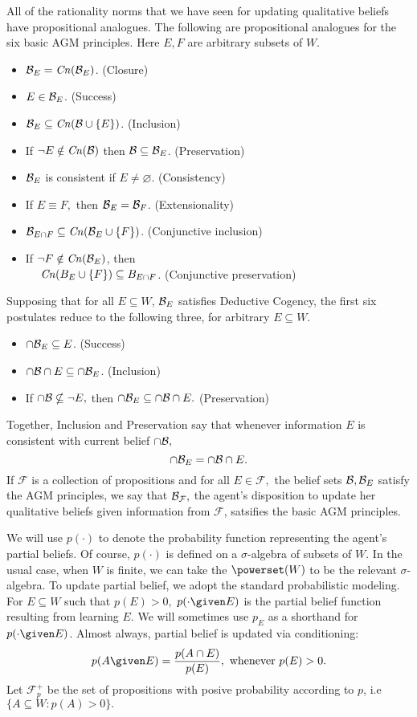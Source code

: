 All of the rationality norms that we have seen for updating qualitative beliefs
have propositional analogues.  The following are propositional analogues for the
six basic AGM principles. Here $E,F$ are arbitrary subsets of $W$.
\begin{itemize}
\item[] $\mathcal{B}_E=\text{\textit{Cn}}(\mathcal{B}_E)$. \hfill(Closure)
\item[] $E\in \mathcal{B}_E$. \hfill(Success)
\item[] $\mathcal{B}_E \subseteq \text{\textit{Cn}}(\mathcal{B} \cup \{ E\})$. \hfill(Inclusion)
\item[] If $\neg E \notin \text{\textit{Cn}}(\mathcal{B})$ then $\mathcal{B} \subseteq \mathcal{B}_E$.
\hfill(Preservation)
\item[] $\mathcal{B}_E$ is consistent if $E\neq \varnothing$. \hfill(Consistency)
\item[] If $E\equiv F,$ then $\mathcal{B}_E = \mathcal{B}_F$. \hfill(Extensionality)
\item[] $\mathcal{B}_{E\cap F} \subseteq \text{\textit{Cn}}(\mathcal{B}_{E} \cup \{F\})$. \hfill(Conjunctive
inclusion)
\item[] If $\neg F \notin \text{\textit{Cn}}(\mathcal{B}_E)$, then\\$\phantom{M}$\hspace{1.5em}
$\text{\textit{Cn}}(B_E \cup \{F\}) \subseteq B_{E\cap F}$. \hfill(Conjunctive preservation)
\end{itemize}
Supposing that for all $E\subseteq W$, $\mathcal{B}_E$ satisfies Deductive Cogency, the
first six postulates reduce to the following three, for arbitrary $E\subseteq
W$.
\begin{itemize}
\item[] $\cap \mathcal{B}_E \subseteq E$. \hfill(Success)
\item[] $\cap \mathcal{B} \cap E \subseteq \cap \mathcal{B}_{E}$. \hfill(Inclusion)
\item[] If $\cap \mathcal{B} \nsubseteq \neg E,$ then $\cap \mathcal{B}_{E} \subseteq \cap
\mathcal{B} \cap E.$ \hfill(Preservation)
\end{itemize}
Together, Inclusion and Preservation say that whenever information $E$ is
consistent with  current belief $\cap \mathcal{B},$ $$\cap \mathcal{B}_E = \cap \mathcal{B} \cap E.$$
If $\mathcal{F}$ is a collection of propositions and for all $E\in \mathcal{F},$
the belief sets $\mathcal{B},\mathcal{B}_E$ satisfy the AGM principles, we say that
$\mathcal{B}_{\mathcal{F}},$ the agent's disposition to update her qualitative beliefs
given information from $\mathcal{F}$, satsifies the basic AGM principles.

We will use $p(\cdot)$ to denote the probability function representing the
agent's partial beliefs. Of course, $p(\cdot)$ is defined on a $\sigma$-algebra
of subsets of $W$. In the usual case, when $W$ is finite, we can take the
$\powerset(W)$ to be the relevant $\sigma$-algebra. To update partial belief, we
adopt the standard probabilistic modeling. For $E\subseteq W$ such that
$p(E)>0,$ $p(\cdot \given E)$ is the partial belief function resulting from
learning $E.$ We will sometimes use $p_E$ as a shorthand for $p(\cdot \given
E)$. Almost always, partial belief is updated via conditioning: $$p(A \given E)
= \frac{p(A\cap E)}{p(E)}, \text{ whenever } p(E)>0.$$ Let $\mathcal{F}_p^+$ be
the set of propositions with posive probability according to $p$, i.e $\{ A
\subseteq W : p(A)>0\}.$

